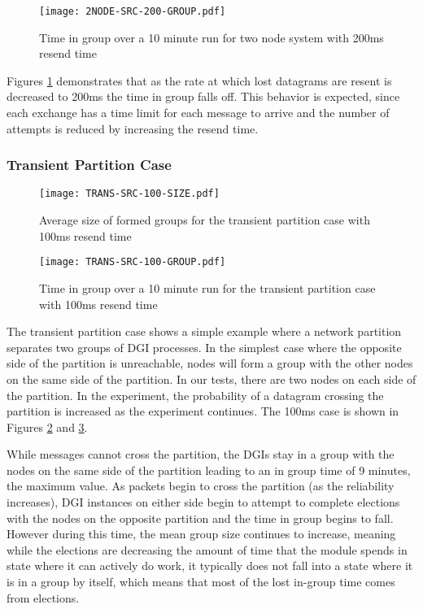 \begin{figure}[!h]
\centering
\texttt{[image: 2NODE-SRC-200-GROUP.pdf]}
\caption{Time in group over a 10 minute run for two node system with 200ms resend time}
\label{fig:IGT-SRC-2NODE-200}
\end{figure}

Figures \ref{fig:IGT-SRC-2NODE-200} demonstrates that as the
rate at which lost datagrams are resent is decreased to 200ms the
time in group falls off. This behavior is expected, since each exchange has a
time limit for each message to arrive and the number of attempts is reduced by
increasing the resend time.


\subsubsection{Transient Partition Case}

\begin{figure}[!h]
\centering
\texttt{[image: TRANS-SRC-100-SIZE.pdf]}
\caption{Average size of formed groups for the transient partition case with 100ms resend time}
\label{fig:MGS-SRC-TRANS-100}
\end{figure}

\begin{figure}[!h]
\centering
\texttt{[image: TRANS-SRC-100-GROUP.pdf]}
\caption{Time in group over a 10 minute run for the transient partition case with 100ms resend time}
\label{fig:IGT-SRC-TRANS-100}
\end{figure}

The transient partition case shows a simple example where a network partition
separates two groups of DGI processes. In the simplest case where the opposite side of
the partition is unreachable, nodes will form a group with the other nodes on the
same side of the partition. In our tests, there are two nodes on each side of
the partition. In the experiment, the probability of a datagram crossing the
partition is increased as the experiment continues. The 100ms case is shown in
Figures \ref{fig:MGS-SRC-TRANS-100} and \ref{fig:IGT-SRC-TRANS-100}.

While messages cannot cross the partition, the DGIs stay in a group with the
nodes on the same side of the partition leading to an in group time of 9 minutes,
the maximum value. As packets begin to cross the partition (as the reliability
increases), DGI instances on either side begin to attempt to complete elections
with the nodes on the opposite partition and the time in group begins to fall.
However during this time, the mean group size continues to increase, meaning
while the elections are decreasing the amount of time that the module spends in
state where it can actively do work, it typically does not fall into a state
where it is in a group by itself, which means that most of the lost in-group
time comes from elections.

